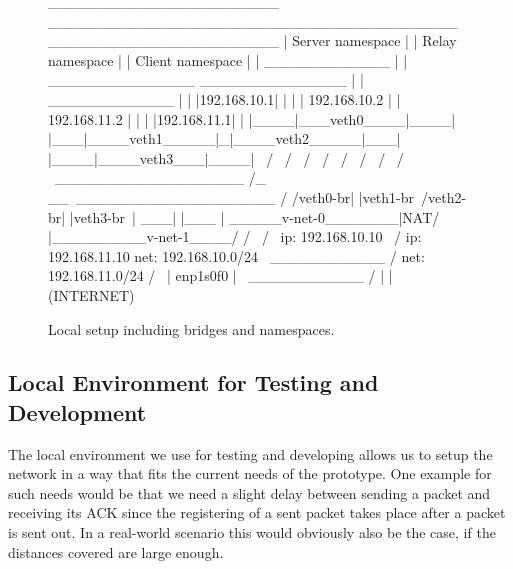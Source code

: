 \vspace{0.5cm}
\begin{figure}[H]
\centering
\begin{myverbatim}
 ______________________         _______________________________________        ______________________
|   Server namespace   |       |            Relay namespace            |      |   Client namespace   |
|     ____________     |       |    ______________   ______________    |      |     ____________     |
|    |192.168.10.1|    |       |   | 192.168.10.2 | | 192.168.11.2 |   |      |    |192.168.11.1|    |
|____|___veth0____|____|       |___|____veth1_____|_|____veth2_____|___|      |____|____veth3___|____|
            \                            /                 \                             /
             \                          /                   \                           /
              \                        /                     \                         /
               \                      /                       \                       /
                \ __________________ /_                      __\ ___________________ /
                /veth0-br|     |veth1-br\                   /veth2-br|      |veth3-br\
                |                    ___|                   |___                     |
                \_____v-net-0_______|NAT/                   \NAT|_________v-net-1____/
                        /              \                     /                \
               ip: 192.168.10.10        \                   /         ip: 192.168.11.10
               net: 192.168.10.0/24      \   ___________   /          net: 192.168.11.0/24
                                           /             \
                                          |   enp1s0f0    |
                                           \ ___________ /
                                                  |
                                                  |
                                              (INTERNET)

\end{myverbatim}
\caption{Local setup including bridges and namespaces.}\label{fig:namespace-setup}
\end{figure}
\vspace{0.5cm}

\subsection{Local Environment for Testing and Development}\label{subsec:namespace_environment}
The local environment we use for testing and developing allows us to setup the network in a way 
that fits the current needs of the prototype.
One example for such needs would be that we need a slight delay between sending a packet and 
receiving its ACK since the registering of a sent packet takes place after a packet 
is sent out. 
In a real-world scenario this would obviously also be the case, if the distances covered 
are large enough.

